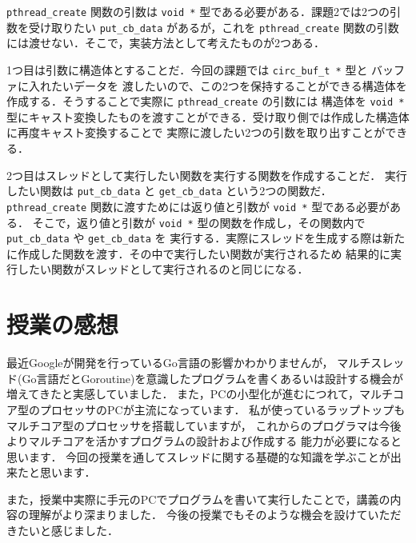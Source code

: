 \documentclass[10pt]{jarticle}
\begin{document}
\verb|pthread_create| 関数の引数は \verb|void *| 型である必要がある．課題2では2つの引数を受け取りたい \verb|put_cb_data|
があるが，これを \verb|pthread_create| 関数の引数には渡せない．そこで，実装方法として考えたものが2つある．

1つ目は引数に構造体とすることだ．今回の課題では \verb|circ_buf_t *| 型と バッファに入れたいデータを
渡したいので、この2つを保持することができる構造体を作成する．そうすることで実際に \verb|pthread_create| の引数には
構造体を \verb|void *| 型にキャスト変換したものを渡すことができる．受け取り側では作成した構造体に再度キャスト変換することで
実際に渡したい2つの引数を取り出すことができる．

2つ目はスレッドとして実行したい関数を実行する関数を作成することだ．
実行したい関数は \verb|put_cb_data| と \verb|get_cb_data| という2つの関数だ．
\verb|pthread_create| 関数に渡すためには返り値と引数が \verb|void *| 型である必要がある．
そこで，返り値と引数が \verb|void *| 型の関数を作成し，その関数内で \verb|put_cb_data| や \verb|get_cb_data| を
実行する．実際にスレッドを生成する際は新たに作成した関数を渡す．その中で実行したい関数が実行されるため
結果的に実行したい関数がスレッドとして実行されるのと同じになる．

\section{授業の感想}
最近Googleが開発を行っているGo言語の影響かわかりませんが，
マルチスレッド(Go言語だとGoroutine)を意識したプログラムを書くあるいは設計する機会が
増えてきたと実感していました．
また，PCの小型化が進むにつれて，マルチコア型のプロセッサのPCが主流になっています．
私が使っているラップトップもマルチコア型のプロセッサを搭載していますが，
これからのプログラマは今後よりマルチコアを活かすプログラムの設計および作成する
能力が必要になると思います．
今回の授業を通してスレッドに関する基礎的な知識を学ぶことが出来たと思います．

また，授業中実際に手元のPCでプログラムを書いて実行したことで，講義の内容の理解がより深まりました．
今後の授業でもそのような機会を設けていただきたいと感じました．
\end{document}
